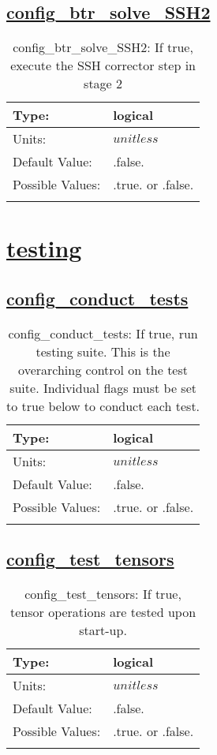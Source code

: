 \subsection[config\_btr\_solve\_SSH2]{\hyperref[sec:nm_tab_split_explicit_ts]{config\_btr\_solve\_SSH2}}
\label{subsec:nm_sec_config_btr_solve_SSH2}
\begin{center}
\begin{longtable}{| p{2.0in} || p{4.0in} |}
    \hline
    Type: & logical \\
    \hline
    Units: & $unitless$ \\
    \hline
    Default Value: & .false. \\
    \hline
    Possible Values: & .true. or .false. \\
    \hline
    \caption{config\_btr\_solve\_SSH2: If true, execute the SSH corrector step in stage 2}
\end{longtable}
\end{center}
\section[testing]{\hyperref[sec:nm_tab_testing]{testing}}
\label{sec:nm_sec_testing}
\subsection[config\_conduct\_tests]{\hyperref[sec:nm_tab_testing]{config\_conduct\_tests}}
\label{subsec:nm_sec_config_conduct_tests}
\begin{center}
\begin{longtable}{| p{2.0in} || p{4.0in} |}
    \hline
    Type: & logical \\
    \hline
    Units: & $unitless$ \\
    \hline
    Default Value: & .false. \\
    \hline
    Possible Values: & .true. or .false. \\
    \hline
    \caption{config\_conduct\_tests: If true, run testing suite. This is the overarching control on the test suite. Individual flags must be set to true below to conduct each test.}
\end{longtable}
\end{center}
\subsection[config\_test\_tensors]{\hyperref[sec:nm_tab_testing]{config\_test\_tensors}}
\label{subsec:nm_sec_config_test_tensors}
\begin{center}
\begin{longtable}{| p{2.0in} || p{4.0in} |}
    \hline
    Type: & logical \\
    \hline
    Units: & $unitless$ \\
    \hline
    Default Value: & .false. \\
    \hline
    Possible Values: & .true. or .false. \\
    \hline
    \caption{config\_test\_tensors: If true, tensor operations are tested upon start-up.}
\end{longtable}
\end{center}
